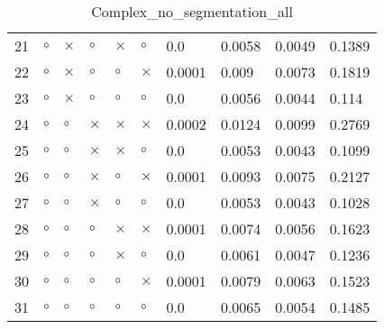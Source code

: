 \begin{table}[H]
\begin{tabular}{|P{0.7cm}|P{1.3cm}P{1.3cm}P{1.3cm}P{1.3cm}P{1.3cm}|P{1.1cm}P{1.1cm}P{1.1cm}P{1.1cm}|}
  21 &  $\circ$ & $\times$ &  $\circ$ &     $\times$ &     $\circ$ &          0.0 &          0.0058 &          0.0049 &          0.1389 \\
  22 &  $\circ$ & $\times$ &  $\circ$ &      $\circ$ &    $\times$ &       0.0001 &           0.009 &          0.0073 &          0.1819 \\
  23 &  $\circ$ & $\times$ &  $\circ$ &      $\circ$ &     $\circ$ &          0.0 &          0.0056 &          0.0044 &           0.114 \\
  24 &  $\circ$ &  $\circ$ & $\times$ &     $\times$ &    $\times$ &       0.0002 &          0.0124 &          0.0099 &          0.2769 \\
  25 &  $\circ$ &  $\circ$ & $\times$ &     $\times$ &     $\circ$ &          0.0 &          0.0053 &          0.0043 &          0.1099 \\
  26 &  $\circ$ &  $\circ$ & $\times$ &      $\circ$ &    $\times$ &       0.0001 &          0.0093 &          0.0075 &          0.2127 \\
  27 &  $\circ$ &  $\circ$ & $\times$ &      $\circ$ &     $\circ$ &          0.0 &          0.0053 &          0.0043 &          0.1028 \\
  28 &  $\circ$ &  $\circ$ &  $\circ$ &     $\times$ &    $\times$ &       0.0001 &          0.0074 &          0.0056 &          0.1623 \\
  29 &  $\circ$ &  $\circ$ &  $\circ$ &     $\times$ &     $\circ$ &          0.0 &          0.0061 &          0.0047 &          0.1236 \\
  30 &  $\circ$ &  $\circ$ &  $\circ$ &      $\circ$ &    $\times$ &       0.0001 &          0.0079 &          0.0063 &          0.1523 \\
  31 &  $\circ$ &  $\circ$ &  $\circ$ &      $\circ$ &     $\circ$ &          0.0 &          0.0065 &          0.0054 &          0.1485 \\
\hline
\end{tabular}
\caption{Complex_no_segmentation_all}
\label{tab:}
\end{table}
